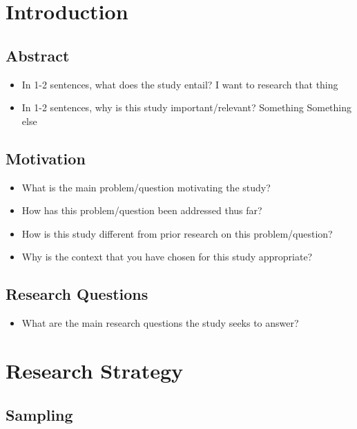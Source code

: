 \documentclass[12pt]{article}
\begin{document}
\section{Introduction}

\subsection{Abstract}

\begin{itemize}
\item In 1-2 sentences, what does the study entail? I want to research that thing
\item In 1-2 sentences, why is this study important/relevant? Something Something else
\end{itemize}

\subsection{Motivation}

\begin{itemize}
\item What is the main problem/question motivating the study?
\item How has this problem/question been addressed thus far?
\item How is this study different from prior research on this problem/question? 
\item Why is the context that you have chosen for this study appropriate?
\end{itemize}

\subsection{Research Questions}

\begin{itemize}
\item What are the main research questions the study seeks to answer?
\end{itemize}

\section{Research Strategy}

\subsection{Sampling}
\end{document}
